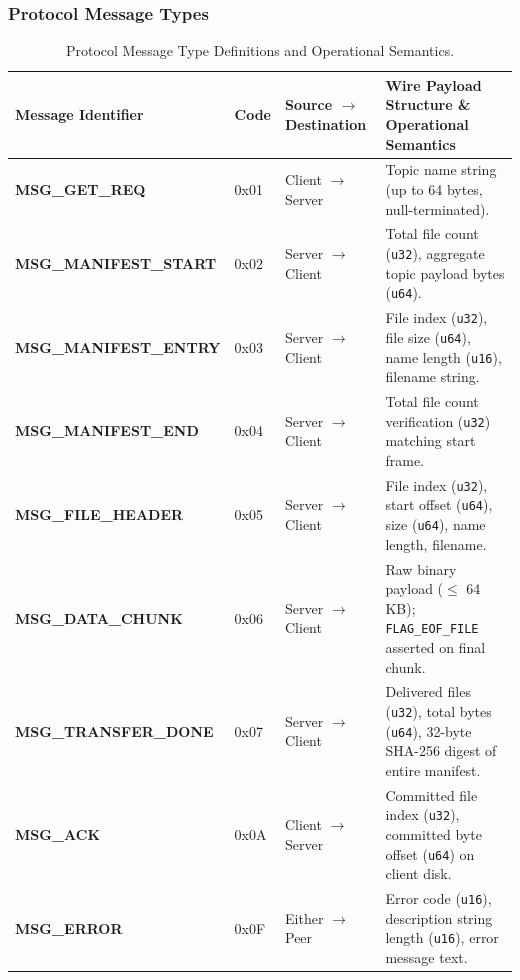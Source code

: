 \documentclass[11pt,a4paper]{article}
\begin{document}
\subsubsection{Protocol Message Types}
\begin{table}[htbp]
\centering
\small
\renewcommand{\arraystretch}{1.15}
\begin{tabularx}{\textwidth}{>{\ttfamily\bfseries}p{4.2cm} >{\centering\arraybackslash\ttfamily}p{1.4cm} >{\centering\arraybackslash}p{2.8cm} X}
    \toprule
    \rowcolor{codebg}
    \textrm{\textbf{Message Identifier}} & \textrm{\textbf{Code}} & \textbf{Source $\to$ Destination} & \textbf{Wire Payload Structure \& Operational Semantics} \\
    \midrule
    MSG\_GET\_REQ         & 0x01 & Client $\to$ Server & Topic name string (up to 64 bytes, null-terminated). \\
    MSG\_MANIFEST\_START  & 0x02 & Server $\to$ Client & Total file count (\texttt{u32}), aggregate topic payload bytes (\texttt{u64}). \\
    MSG\_MANIFEST\_ENTRY  & 0x03 & Server $\to$ Client & File index (\texttt{u32}), file size (\texttt{u64}), name length (\texttt{u16}), filename string. \\
    MSG\_MANIFEST\_END    & 0x04 & Server $\to$ Client & Total file count verification (\texttt{u32}) matching start frame. \\
    MSG\_FILE\_HEADER     & 0x05 & Server $\to$ Client & File index (\texttt{u32}), start offset (\texttt{u64}), size (\texttt{u64}), name length, filename. \\
    MSG\_DATA\_CHUNK      & 0x06 & Server $\to$ Client & Raw binary payload ($\le$ 64 KB); \texttt{FLAG\_EOF\_FILE} asserted on final chunk. \\
    MSG\_TRANSFER\_DONE   & 0x07 & Server $\to$ Client & Delivered files (\texttt{u32}), total bytes (\texttt{u64}), 32-byte SHA-256 digest of entire manifest. \\
    MSG\_ACK              & 0x0A & Client $\to$ Server & Committed file index (\texttt{u32}), committed byte offset (\texttt{u64}) on client disk. \\
    MSG\_ERROR            & 0x0F & Either $\to$ Peer   & Error code (\texttt{u16}), description string length (\texttt{u16}), error message text. \\
    \bottomrule
\end{tabularx}
\caption{Protocol Message Type Definitions and Operational Semantics.}
\label{tab:protocol_messages}
\end{table}
\end{document}
